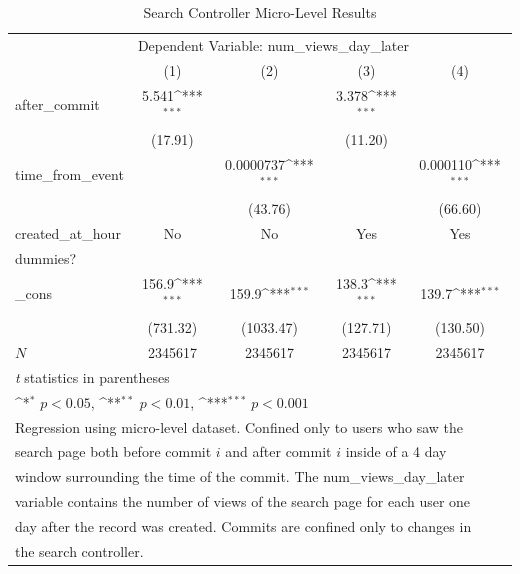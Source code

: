 \documentclass[12pt]{article}
\begin{document}
\begin{table}[h!]
\caption{Search Controller Micro-Level Results}
\centering
{
    \def\sym#1{\ifmmode^{#1}\else\(^{#1}\)\fi}
    \begin{tabular}{l*{4}{c}}
    \hline\hline
        & \multicolumn{4}{l}{Dependent Variable: num\_views\_day\_later} \\ 
        &\multicolumn{1}{c}{(1)}&\multicolumn{1}{c}{(2)}&\multicolumn{1}{c}{(3)}&\multicolumn{1}{c}{(4)}\\
        \hline
        after\_commit&       5.541\sym{***}&               &       3.378\sym{***}&                     \\
        &     (17.91)         &                     &     (11.20)         &                     \\
        [1em]
        time\_from\_event&                     &   0.0000737\sym{***}&                     &    0.000110\sym{***}\\
        &                    &     (43.76)         &                     &     (66.60)         \\
        [1em]
        created\_at\_hour&             No        &           No           &       Yes &      Yes \\
        dummies?&                     &                     &              &            \\
        [1em]
        \_cons      &       156.9\sym{***}&       159.9\sym{***}&       138.3\sym{***}&       139.7\sym{***}\\
        &    (731.32)     &   (1033.47)         &    (127.71)         &    (130.50)         \\
        \hline
        \(N\)       &     2345617       &     2345617         &     2345617         &     2345617         \\
        \hline\hline
        \multicolumn{5}{l}{\footnotesize \textit{t} statistics in parentheses}\\
        \multicolumn{5}{l}{\footnotesize \sym{*} \(p<0.05\), \sym{**} \(p<0.01\), \sym{***} \(p<0.001\)}\\
        \multicolumn{5}{l}{Regression using micro-level dataset. Confined only to users who saw the} \\
        \multicolumn{5}{l}{search page both before commit $i$ and after commit $i$ inside of a 4 day}\\
        \multicolumn{5}{l}{window surrounding the time of the commit. The num\_views\_day\_later} \\
        \multicolumn{5}{l}{variable contains the number of views of the search page for each user one}\\
        \multicolumn{5}{l}{day after the record was created. Commits are confined only to changes in} \\
        \multicolumn{5}{l}{the search controller.} 
        \end{tabular}
}
\label{table:search-micro-commit-results}
\end{table}
\end{document}
